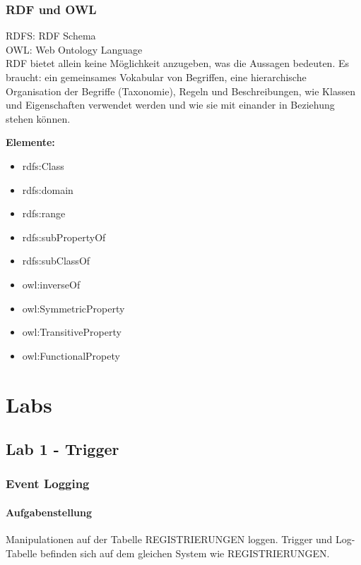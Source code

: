 \documentclass[a4paper,10pt,titlepage=false]{scrreprt}
\begin{document}
\section{RDF und OWL} %
\label{sec:rdf_und_owl}
RDFS: RDF Schema\\
OWL: Web Ontology Language\\
RDF bietet allein keine Möglichkeit anzugeben, was
die Aussagen bedeuten.
Es braucht:
ein gemeinsames Vokabular von Begriffen,
eine hierarchische Organisation der Begriffe
(Taxonomie),
Regeln und Beschreibungen, wie Klassen und
Eigenschaften verwendet werden und wie sie mit
einander in Beziehung stehen können.

\textbf{Elemente:}

\begin{itemize}
  \item rdfs:Class
\item rdfs:domain
\item rdfs:range
\item rdfs:subPropertyOf
\item rdfs:subClassOf
\item owl:inverseOf
\item owl:SymmetricProperty
\item owl:TransitiveProperty
\item owl:FunctionalPropety

\end{itemize}

\part{Labs} %
\label{prt:labs_}
\chapter{Lab 1 - Trigger}
\section{Event Logging}
\subsection{Aufgabenstellung}
Manipulationen auf der Tabelle REGISTRIERUNGEN loggen. Trigger und Log-Tabelle befinden sich auf dem gleichen System wie REGISTRIERUNGEN.\\
\end{document}
